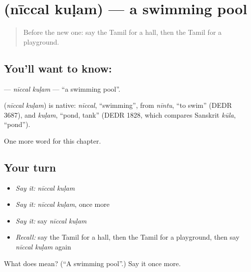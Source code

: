 \section[\texorpdfstring{\ta{நீச்சல்} \ta{குளம்} (nīccal kuḷam)}{நீச்சல் குளம் (nīccal kuḷam)}]{  (nīccal kuḷam) — a swimming pool}

\label{lesson:TA-C206-niccal-kulam}



\begin{quote}
Before the new one: say the Tamil for a hall, then the Tamil for a playground.
\end{quote}

\subsection*{You'll want to know:  }
\textbf{ } — \emph{nīccal kuḷam} — \textquotedblleft{}a swimming pool\textquotedblright{}.

\begin{cousinweb}
\textbf{ } (\emph{nīccal kuḷam}) is native: \emph{nīccal}, \textquotedblleft{}swimming\textquotedblright{}, from \emph{nīntu}, \textquotedblleft{}to swim\textquotedblright{} (DEDR 3687), and \emph{kuḷam}, \textquotedblleft{}pond, tank\textquotedblright{} (DEDR 1828, which compares Sanskrit \emph{kūla}, \textquotedblleft{}pond\textquotedblright{}).
\end{cousinweb}

\begin{grammarlens}[title={What you've built}]
One more word for this chapter.
\end{grammarlens}

\subsection*{Your turn}
\begin{itemize}
\raggedright
  \item \emph{Say it:} \emph{nīccal kuḷam}
  \item \emph{Say it:} \emph{nīccal kuḷam}, once more
  \item \emph{Say it:} say \emph{nīccal kuḷam}
  \item \emph{Recall:} say the Tamil for a hall, then the Tamil for a playground, then say \emph{nīccal kuḷam} again
\end{itemize}

\begin{tcolorbox}[breakable,colback=teal!4,colframe=teal!35!black,title={Before you move on}]
What does   mean? (\textquotedblleft{}A swimming pool\textquotedblright{}.) Say it once more.
\end{tcolorbox}
